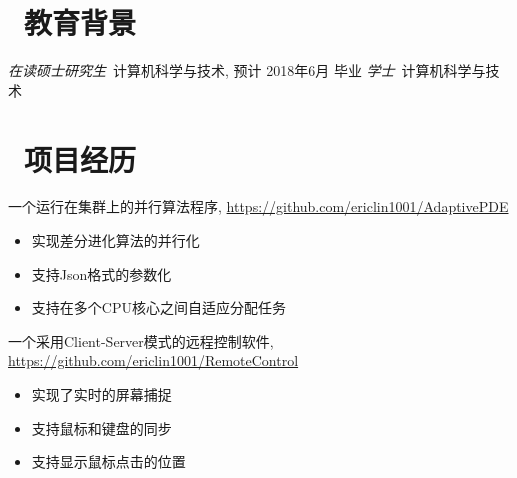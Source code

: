 \documentclass{resume}
\begin{document}


\basicInfo{
	\email{ericlin1001@qq.com} \textperiodcentered\ 
	\phone{(+86) 135-8053-2764} 
}

\section{\faGraduationCap\ 教育背景}
\textit{在读硕士研究生}\  计算机科学与技术, 预计 2018年6月 毕业
\textit{学士}\ 计算机科学与技术 


\section{\faUsers\ 项目经历}
一个运行在集群上的并行算法程序, \url{https://github.com/ericlin1001/AdaptivePDE}
\begin{itemize}
	\item 实现差分进化算法的并行化
	\item 支持Json格式的参数化
	\item 支持在多个CPU核心之间自适应分配任务
\end{itemize}

一个采用Client-Server模式的远程控制软件, \url{https://github.com/ericlin1001/RemoteControl}
\begin{itemize}
	\item 实现了实时的屏幕捕捉
	\item 支持鼠标和键盘的同步
	\item 支持显示鼠标点击的位置
\end{itemize}
\end{document}
